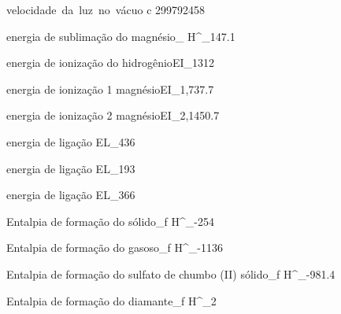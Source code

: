{ velocidade~da~luz~no~vácuo }{ c }
{299792458}{\meter\per\second}

%                                              
%                                              


\ExplSyntaxOff

{energia de sublimação do magnésio}{\Delta_{} H^{\standardstate}_{}}{147.1}{\kilo\joule\per\mol}


{energia de ionização do hidrogênio}{EI_{}}{1312}{\kilo\joule\per\mol}

{energia de ionização 1 magnésio}{EI_{1,}}{737.7}{\kilo\joule\per\mol}

{energia de ionização 2 magnésio}{EI_{2,}}{1450.7}{\kilo\joule\per\mol}

{energia de ligação }{EL_{}}{436}{\kilo\joule\per\mol}

{energia de ligação }{EL_{}}{193}{\kilo\joule\per\mol}

{energia de ligação }{EL_{}}{366}{\kilo\joule\per\mol}


{Entalpia de formação do  sólido}{\Delta_{f} H^{\standardstate}_{}}{-254}{\kilo\joule\per\mol}

{Entalpia de formação do  gasoso}{\Delta_{f} H^{\standardstate}_{}}{-1136}{\kilo\joule\per\mol}



{Entalpia de formação do sulfato de chumbo (II) sólido}{\Delta_{f} H^{\standardstate}_{}}{-981.4}{\kilo\joule\per\mol}

{Entalpia de formação do diamante}{\Delta_{f} H^{\standardstate}_{}}{2}{\kilo\joule\per\mol}


